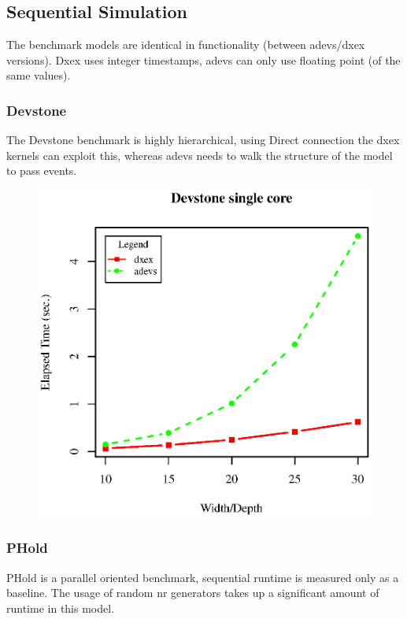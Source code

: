 \subsection{Sequential Simulation}
The benchmark models are identical in functionality (between adevs/dxex versions). Dxex uses integer timestamps, adevs can only use floating point (of the same values).
\subsubsection{Devstone}
The Devstone \cite{DEVStone} benchmark is highly hierarchical, using Direct connection the dxex kernels can exploit this, whereas adevs needs to walk the structure of the model to pass events.\\
\begin{figure}[h]
	\includegraphics[width=.5\textwidth]{fig/fig1.eps}
	\label{fig1.eps}
\end{figure}

\subsubsection{PHold}
PHold \cite{PHOLD} is a parallel oriented benchmark, sequential runtime is measured only as a baseline. The usage of random nr generators takes up a significant amount of runtime in this model.

